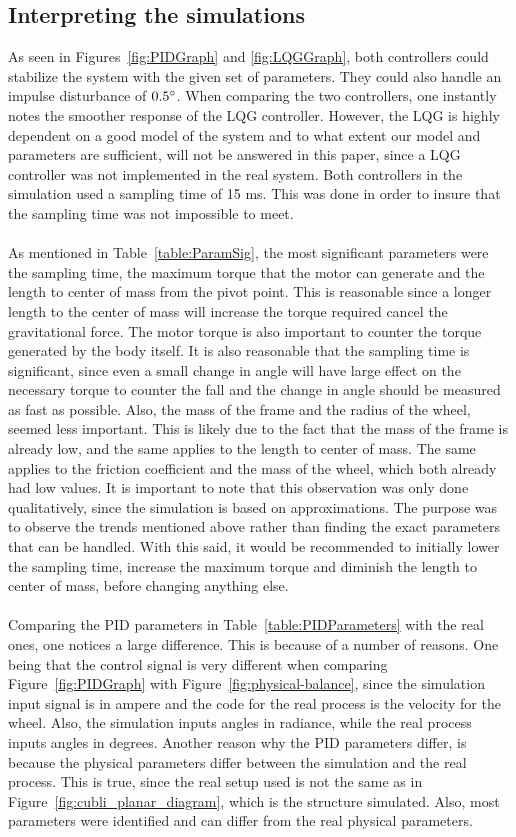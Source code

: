 \subsection{Interpreting the simulations}
As seen in Figures~\ref{fig:PIDGraph} and \ref{fig:LQGGraph}, both controllers could stabilize the system with the given set of parameters. They could also handle an impulse disturbance of $0.5\degree$. When comparing the two controllers, one instantly notes the smoother response of the LQG controller. However, the LQG is highly dependent on a good model of the system and to what extent our model and parameters are sufficient, will not be answered in this paper, since a LQG controller was not implemented in the real system. Both controllers in the simulation used a sampling time of 15 ms. This was done in order to insure that the sampling time was not impossible to meet.
\\\\
As mentioned in Table~\ref{table:ParamSig}, the most significant parameters were the sampling time, the maximum torque that the motor can generate and the length to center of mass from the pivot point. This is reasonable since a longer length to the center of mass will increase the torque required cancel the gravitational force. The motor torque is also important to counter the torque generated by the body itself. It is also reasonable that the sampling time is significant, since  even a small change in angle will have large effect on the necessary torque to counter the fall and the change in angle should be measured as fast as possible. Also, the mass of the frame and the radius of the wheel, seemed less important. This is likely due to the fact that the mass of the frame is already low, and the same applies to the length to center of mass. The same applies to the friction coefficient and the mass of the wheel, which both already had low values. It is important to note that this observation was only done qualitatively, since the simulation is based on approximations. The purpose was to observe the trends mentioned above rather than finding the exact parameters that can be handled. With this said, it would be recommended to initially lower the sampling time, increase the maximum torque and diminish the length to center of mass, before changing anything else. 
\\\\
Comparing the PID parameters in Table~\ref{table:PIDParameters} with the real ones, one notices a large difference. This is because of a number of reasons. One being that the control signal is very different when comparing Figure~\ref{fig:PIDGraph} with Figure~\ref{fig:physical-balance}, since the simulation input signal is in ampere and the code for the real process is the velocity for the wheel. Also, the simulation inputs angles in radiance, while the real process inputs angles in degrees. Another reason why the PID parameters differ, is because the physical parameters differ between the simulation and the real process. This is true, since the real setup used is not the same as in Figure~\ref{fig:cubli_planar_diagram}, which is the structure simulated. Also, most parameters were identified and can differ from the real physical parameters.

